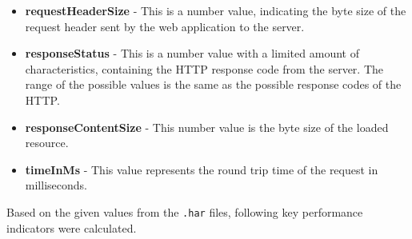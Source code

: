 \begin{itemize}
	\item \textbf{requestHeaderSize} - This is a number value, indicating the byte size of the request header sent by the web application to the server.
	
	\item \textbf{responseStatus} - This is a number value with a limited amount of characteristics, containing the HTTP response code from the server. The range of the possible values is the same as the possible response codes of the HTTP.
	
	\item \textbf{responseContentSize} - This number value is the byte size of the loaded resource.
	
	\item \textbf{timeInMs} - This value represents the round trip time of the request in milliseconds. 
\end{itemize}

Based on the given values from the \texttt{.har} files, following key performance indicators were calculated.

